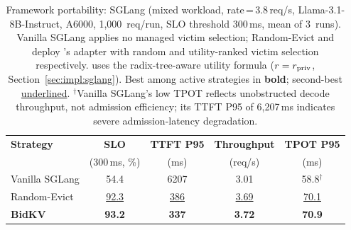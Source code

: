 \begin{table}[t]
\centering
\caption{Framework portability: SGLang (mixed workload, rate\,=\,3.8\,req/s,
  Llama-3.1-8B-Instruct, A6000, 1{,}000~req/run, SLO threshold 300\,ms,
  mean of 3~runs).  Vanilla SGLang applies no managed victim selection;
  Random-Evict and \bidkv deploy \bidkv's adapter with random and
  utility-ranked victim selection respectively.  \bidkv uses the
  radix-tree-aware utility formula ($r = r_{\mathrm{priv}}$,
  Section~\ref{sec:impl:sglang}).  Best among active strategies
  in \textbf{bold}; second-best \underline{underlined}.
  $^\dagger$Vanilla SGLang's low TPOT reflects unobstructed decode throughput,
  not admission efficiency; its TTFT P95 of 6{,}207\,ms indicates severe
  admission-latency degradation.}
\label{tab:sglang}
\footnotesize
\begin{tabular}{@{}l c c c c@{}}
\toprule
\textbf{Strategy} & \textbf{SLO}
  & \textbf{TTFT P95} & \textbf{Throughput} & \textbf{TPOT P95} \\
  & (300\,ms, \%) & (ms) & (req/s) & (ms) \\
\midrule
Vanilla SGLang    & 54.4 & 6207 & 3.01 & 58.8$^\dagger$ \\
Random-Evict      & \underline{92.3} & \underline{386} & \underline{3.69} & \underline{70.1} \\
\textbf{BidKV}    & \textbf{93.2} & \textbf{337} & \textbf{3.72} & \textbf{70.9} \\
\bottomrule
\end{tabular}
\end{table}
